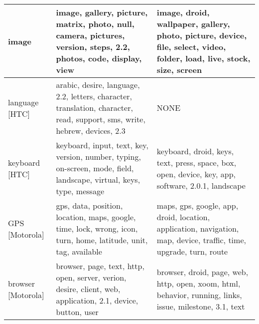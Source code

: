 \begin{table*}[!htb]
\begin{tabular}{|m{1.75cm}<{\centering}||m{7.33cm}<{\centering}||m{7.33cm}<{\centering}|}
image
&
image,  gallery,  picture,  matrix,  photo,  
null,  camera,  pictures,  version,  steps,  
2.2,  photos,  code,  display,  view 
&
image,  droid,  wallpaper,  gallery,  photo, 
picture,  device,  file,  select, video, 
 folder,  load,  live,  stock,  size,  screen
\\ \hline
\hline
language 
[HTC]
&
arabic,  desire,  language,  2.2,  letters,  
character,  translation,  character,  read,  support,  
sms,  write,  hebrew,  devices, 2.3 
&
NONE
\\ \hline
keyboard
[HTC]
&
keyboard,  input, text,  key,  version,  
number,  typing,  on-screen,  mode,  field,  
  landscape,  virtual,  keys,  type,  message 
&
keyboard,  droid,  keys, text,  press, 
space,  box,  open,  device,  key, 
app,  software,  2.0.1,  landscape
\\ \hline
\hline
GPS 
[Motorola]
& 
gps,  data, position,  location,  maps,  
google,  time, lock,  wrong,  icon,  turn,  
home,  latitude,  unit,  tag,  available 
&
maps,  gps,  google,  app,  droid, 
location,  application,  navigation,  map, device, 
traffic,  time,  upgrade,  turn,  route
\\ \hline
browser
[Motorola]
&
browser,  page,  text,  http,  open,  
server, verion,  desire,  client,  web,  
application, 2.1,  device,  button,  user 
&
browser,  droid,  page,  web,  http,  open, 
xoom,  html,  behavior,  running,  links, 
issue,  milestone,  3.1,  text
\\ \hline


\end{tabular}
\end{table*}

